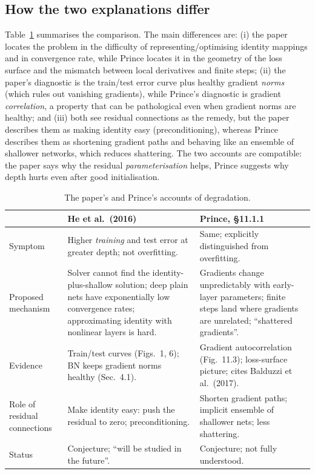 \documentclass[11pt,a4paper]{article}
\newcommand{\paper}{He et al.\ (2016)}
\begin{document}
\subsection{How the two explanations differ}

Table~\ref{tab:explanations} summarises the comparison. The main differences are: (i) the paper locates the problem in the difficulty of representing/optimising identity mappings and in convergence rate, while Prince locates it in the geometry of the loss surface and the mismatch between local derivatives and finite steps; (ii) the paper's diagnostic is the train/test error curve plus healthy gradient \emph{norms} (which rules out vanishing gradients), while Prince's diagnostic is gradient \emph{correlation}, a property that can be pathological even when gradient norms are healthy; and (iii) both see residual connections as the remedy, but the paper describes them as making identity easy (preconditioning), whereas Prince describes them as shortening gradient paths and behaving like an ensemble of shallower networks, which reduces shattering. The two accounts are compatible: the paper says why the residual \emph{parameterisation} helps, Prince suggests why depth hurts even after good initialisation.

\begin{table}[htbp]
\centering
\footnotesize
\caption{The paper's and Prince's accounts of degradation.}
\label{tab:explanations}
\begin{tabular}{@{}p{2.7cm}p{6.2cm}p{6.2cm}@{}}
\toprule
 & \textbf{\paper} & \textbf{Prince, \S11.1.1}\\
\midrule
Symptom & Higher \emph{training} and test error at greater depth; not overfitting. & Same; explicitly distinguished from overfitting.\\
Proposed mechanism & Solver cannot find the identity-plus-shallow solution; deep plain nets have exponentially low convergence rates; approximating identity with nonlinear layers is hard. & Gradients change unpredictably with early-layer parameters; finite steps land where gradients are unrelated; ``shattered gradients''.\\
Evidence & Train/test curves (Figs.~1, 6); BN keeps gradient norms healthy (Sec.~4.1). & Gradient autocorrelation (Fig.~11.3); loss-surface picture; cites Balduzzi et al.\ (2017).\\
Role of residual connections & Make identity easy: push the residual to zero; preconditioning. & Shorten gradient paths; implicit ensemble of shallower nets; less shattering.\\
Status & Conjecture; ``will be studied in the future''. & Conjecture; not fully understood.\\
\bottomrule
\end{tabular}
\end{table}
\end{document}
